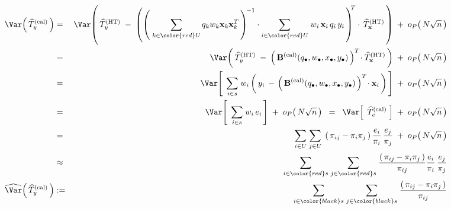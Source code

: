 \begin{lemma}
\begin{eqnarray*}
\Var\!\left(\,\widehat{T}_{y}^{\textnormal{(cal)}}\,\right)
& = &
    \Var\!\left(\,
        \widehat{T}^{\textnormal{(HT)}}_{y}
        \; - \;
        \left(
            \left(\;
                \underset{k \in {\color{red}U}}{\sum}\,q_{k}w_{k}\mathbf{x}_{k}\mathbf{x}_{k}^{T}
                \,\right)^{\!-1}
            \cdot
            \underset{i \in {\color{red}U}}{\sum}\;
            w_{i}\,\mathbf{x}_{i}\,q_{i}\,y_{i}
            \,\right)^{\!\!T}
        \cdot\,
        \widehat{T}_{\mathbf{x}}^{\textnormal{(HT)}}
        \,\right)
    \; + \;
    o_{P}\!\left(\,N\sqrt{n}\,\right)
\\
& = &
    \Var\!\left(\,
        \widehat{T}^{\textnormal{(HT)}}_{y}
        \; - \;
        \left(\,\mathbf{B}^{\textnormal{(cal)}}(q_{\bullet},w_{\bullet},x_{\bullet},y_{\bullet})\,\right)^{T}
        \!\cdot
        \widehat{T}_{\mathbf{x}}^{\textnormal{(HT)}}
        \,\right)
    \; + \;
    o_{P}\!\left(\,N\sqrt{n}\,\right)
\\
& = &
    \Var\!\left[\;\,
        \underset{i \in s}{\sum}\;
        w_{i}
        \left(\,
            y_{i}
            \, - \,
            \left(\,\mathbf{B}^{\textnormal{(cal)}}(q_{\bullet},w_{\bullet},x_{\bullet},y_{\bullet})\,\right)^{T}
            \!\cdot
            \mathbf{x}_{i}
            \,\right)
        \,\right]
    \; + \;
    o_{P}\!\left(\,N\sqrt{n}\,\right)
\\
& = &
    \Var\!\left[\;\,
        \underset{i \in s}{\sum}\;w_{i}\,e_{i}
        \,\right]
    \; + \;
    o_{P}\!\left(\,N\sqrt{n}\,\right)
\;\; = \;\;
    \Var\!\left[\;\,
        \widehat{T}^{\textnormal{(cal)}}_{e}
        \;\right]
    \; + \;
    o_{P}\!\left(\,N\sqrt{n}\,\right)
\\
& = &
    \underset{i \in U}{\sum}\;
    \underset{j \in U}{\sum}\;
    \left(\,\pi_{ij} - \pi_{i}\pi_{j}\,\right)
    \dfrac{e_{i}}{\pi_{i}}\,
    \dfrac{e_{j}}{\pi_{j}}
    \; + \;
    o_{P}\!\left(\,N\sqrt{n}\,\right)
\\
& \approx &
    \underset{i \in {\color{red}s}}{\sum}\;
    \underset{j \in {\color{red}s}}{\sum}\;
    \dfrac{\left(\,\pi_{ij} - \pi_{i}\pi_{j}\,\right)}{\pi_{ij}}
    \dfrac{e_{i}}{\pi_{i}}\,
    \dfrac{e_{j}}{\pi_{j}}
\\
\widehat{\Var}\!\left(\,\widehat{T}_{y}^{\textnormal{(cal)}}\,\right)
& := &
    \underset{i \in {\color{black}s}}{\sum}\;
    \underset{j \in {\color{black}s}}{\sum}\;
    \dfrac{\left(\,\pi_{ij} - \pi_{i}\pi_{j}\,\right)}{\pi_{ij}}

\end{eqnarray*}
\end{lemma}

